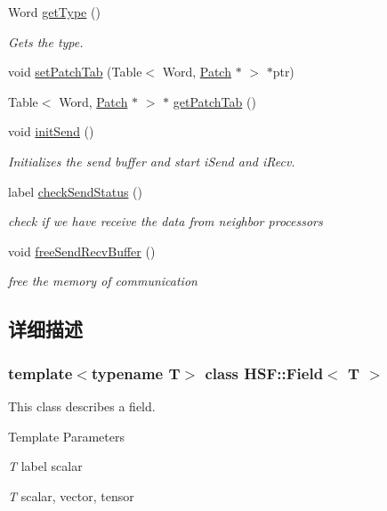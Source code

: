 \begin{DoxyCompactItemize}
Word \hyperlink{classHSF_1_1Field_a43dc37894e37f158679ad2af096e8339}{getType} ()
\begin{DoxyCompactList}\small\item\em Gets the type. \item\end{DoxyCompactList}\item 
void \hyperlink{classHSF_1_1Field_aed5ee473bb4d75234e5ae9c73131a56a}{setPatchTab} (Table$<$ Word, \hyperlink{classHSF_1_1Patch}{Patch} $\ast$ $>$ $\ast$ptr)
\item 
Table$<$ Word, \hyperlink{classHSF_1_1Patch}{Patch} $\ast$ $>$ $\ast$ \hyperlink{classHSF_1_1Field_ae24798c8bdfd10a71f32cd7be92e570c}{getPatchTab} ()
\item 
void \hyperlink{classHSF_1_1Field_aeffce8b232389b100bb2408347c68943}{initSend} ()
\begin{DoxyCompactList}\small\item\em Initializes the send buffer and start iSend and iRecv. \item\end{DoxyCompactList}\item 
label \hyperlink{classHSF_1_1Field_a11428b9621735dae6b01939a480295a3}{checkSendStatus} ()
\begin{DoxyCompactList}\small\item\em check if we have receive the data from neighbor processors \item\end{DoxyCompactList}\item 
void \hyperlink{classHSF_1_1Field_a646bc44e3bd328d6b6ead58f91ae662c}{freeSendRecvBuffer} ()
\begin{DoxyCompactList}\small\item\em free the memory of communication \item\end{DoxyCompactList}\end{DoxyCompactItemize}


\subsection{详细描述}
\subsubsection*{template$<$typename T$>$ class HSF::Field$<$ T $>$}

This class describes a field. 
\begin{DoxyTemplParams}{Template Parameters}
\item[{\em T}]label scalar\item[{\em T}]scalar, vector, tensor \end{DoxyTemplParams}


